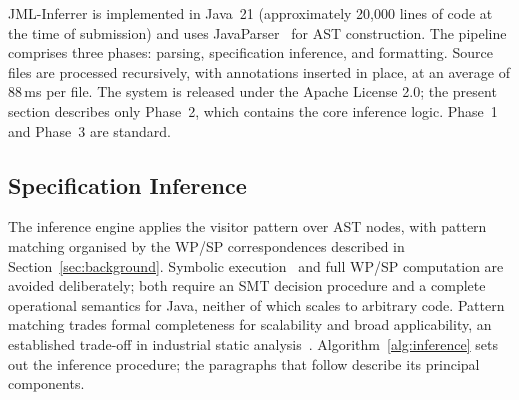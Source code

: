 JML-Inferrer is implemented in Java~21 (approximately 20{,}000 lines of code at the time of submission) and uses JavaParser~\cite{javaparser} for AST construction. The pipeline comprises three phases: parsing, specification inference, and formatting. Source files are processed recursively, with annotations inserted in place, at an average of 88\,ms per file. The system is released under the Apache License 2.0; the present section describes only Phase~2, which contains the core inference logic. Phase~1 and Phase~3 are standard.

\subsection{Specification Inference}

The inference engine applies the visitor pattern over AST nodes, with pattern matching organised by the WP/SP correspondences described in Section~\ref{sec:background}. Symbolic execution~\cite{king1976symbolic, cadar2008klee} and full WP/SP computation are avoided deliberately; both require an SMT decision procedure and a complete operational semantics for Java, neither of which scales to arbitrary code. Pattern matching trades formal completeness for scalability and broad applicability, an established trade-off in industrial static analysis~\cite{calcagno2015infer}. Algorithm~\ref{alg:inference} sets out the inference procedure; the paragraphs that follow describe its principal components.


